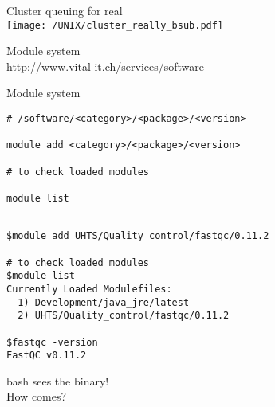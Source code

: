 \documentclass[xcolor=dvipsnames]{beamer}
\begin{document}
\begin{frame}
	\begin{center}	
		\Huge
		Cluster queuing for real\\
		\vspace{1cm}
		\texttt{[image: /UNIX/cluster\_really\_bsub.pdf]}
	\end{center}
\end{frame}

\begin{frame}
	\begin{center}
		\Huge
		Module system\\
		\vspace{1cm}
		\Large
		\url{http://www.vital-it.ch/services/software}
	\end{center}
\end{frame}

\begin{frame}[fragile]
	\begin{center}
		\Huge
		Module system\\
		\vspace{1cm}
\large
\begin{verbatim}
# /software/<category>/<package>/<version>

module add <category>/<package>/<version>

# to check loaded modules

module list
\end{verbatim}
	\end{center}
\end{frame}

\begin{frame}[fragile]
\large
\begin{verbatim}

$module add UHTS/Quality_control/fastqc/0.11.2

# to check loaded modules
$module list
Currently Loaded Modulefiles:
  1) Development/java_jre/latest
  2) UHTS/Quality_control/fastqc/0.11.2
  
$fastqc -version
FastQC v0.11.2
\end{verbatim}
\end{frame}

\begin{frame}
	\begin{center}
		\Huge
		bash sees the binary!\\
		\vspace{1cm}
		\Large
		How comes?
	\end{center}
\end{frame}
\end{document}
